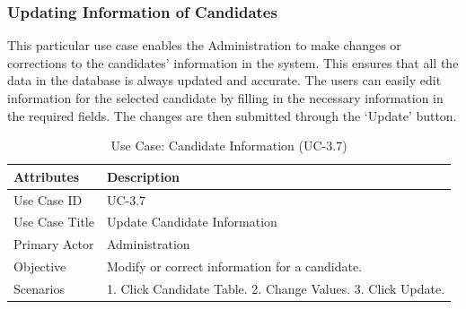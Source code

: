 \subsubsection{Updating Information of Candidates}

This particular use case enables the Administration to make changes or corrections to the candidates’ information in the system. This ensures that all the data in the database is always updated and accurate. The users can easily edit information for the selected candidate by filling in the necessary information in the required fields. The changes are then submitted through the ‘Update’ button.

\begin{table}[H]
    \centering
    \small
    \renewcommand{\arraystretch}{1.4} %
    \begin{tabularx}{\textwidth}{|l|X|}
        \hline
        \rowcolor[gray]{0.9} {Attributes} & {Description} \\ \hline
        Use Case ID & UC-3.7 \\ \hline
        Use Case Title & Update Candidate Information \\ \hline
        Primary Actor & Administration \\ \hline
        Objective & Modify or correct information for a candidate. \\ \hline
        Scenarios & 1. Click Candidate Table. 2. Change Values. 3. Click Update. \\ \hline
    \end{tabularx}
    \caption{Use Case: Candidate Information (UC-3.7)}
    \label{tab:update-candidate-info}
\end{table}
\FloatBarrier